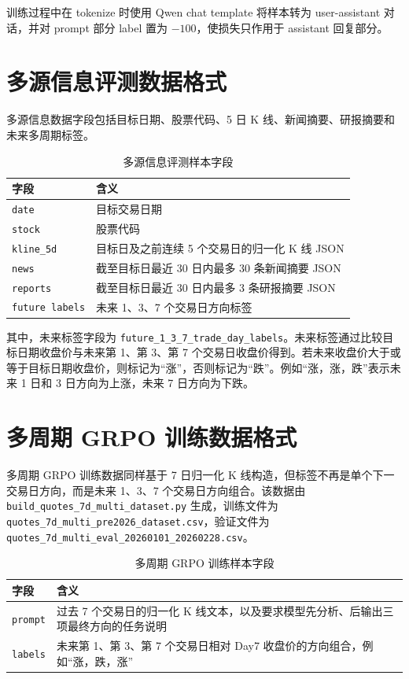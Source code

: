 训练过程中在 tokenize 时使用 Qwen chat template 将样本转为 user-assistant 对话，并对 prompt 部分 label 置为 \(-100\)，使损失只作用于 assistant 回复部分。

\section{多源信息评测数据格式}

多源信息数据字段包括目标日期、股票代码、5 日 K 线、新闻摘要、研报摘要和未来多周期标签。

\begin{table}[htbp]
  \centering
  \caption{多源信息评测样本字段}
  \begin{tabular}{@{}p{}p{}@{}}
    \toprule
    字段 & 含义 \\
    \midrule
    \texttt{date} & 目标交易日期 \\
    \texttt{stock} & 股票代码 \\
    \texttt{kline\_5d} & 目标日及之前连续 5 个交易日的归一化 K 线 JSON \\
    \texttt{news} & 截至目标日最近 30 日内最多 30 条新闻摘要 JSON \\
    \texttt{reports} & 截至目标日最近 30 日内最多 3 条研报摘要 JSON \\
    \texttt{future labels} & 未来 1、3、7 个交易日方向标签 \\
    \bottomrule
  \end{tabular}
\end{table}

其中，未来标签字段为 \texttt{future\_1\_3\_7\_trade\_day\_labels}。未来标签通过比较目标日期收盘价与未来第 1、第 3、第 7 个交易日收盘价得到。若未来收盘价大于或等于目标日期收盘价，则标记为“涨”，否则标记为“跌”。例如“涨，涨，跌”表示未来 1 日和 3 日方向为上涨，未来 7 日方向为下跌。

\section{多周期 GRPO 训练数据格式}

多周期 GRPO 训练数据同样基于 7 日归一化 K 线构造，但标签不再是单个下一交易日方向，而是未来 1、3、7 个交易日方向组合。该数据由 \texttt{build\_quotes\_7d\_multi\_dataset.py} 生成，训练文件为 \texttt{quotes\_7d\_multi\_pre2026\_dataset.csv}，验证文件为 \texttt{quotes\_7d\_multi\_eval\_20260101\_20260228.csv}。

\begin{table}[htbp]
  \centering
  \caption{多周期 GRPO 训练样本字段}
  \begin{tabular}{@{}p{}p{}@{}}
    \toprule
    字段 & 含义 \\
    \midrule
    \texttt{prompt} & 过去 7 个交易日的归一化 K 线文本，以及要求模型先分析、后输出三项最终方向的任务说明 \\
    \texttt{labels} & 未来第 1、第 3、第 7 个交易日相对 Day7 收盘价的方向组合，例如“涨，跌，涨” \\
    \bottomrule
  \end{tabular}
\end{table}

